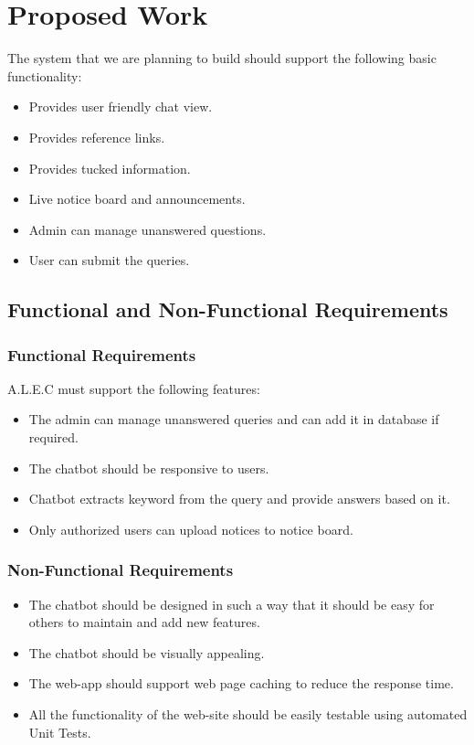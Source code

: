 \documentclass{mnnit}
\begin{document}
\chapter{Proposed Work}
The system that we are planning to build should support the following basic functionality:

\begin{itemize}
	\item Provides user friendly chat view.
	\item Provides reference links.
	\item Provides tucked information.
	\item Live notice board and announcements.
    \item Admin can manage unanswered questions.
	\item User can submit the queries.
\end{itemize}


\section{Functional and Non-Functional Requirements}
\subsection{Functional Requirements}
   A.L.E.C must support the following features:

\begin{itemize}
	\item The admin can manage unanswered queries and can add it in database if required.
	\item The chatbot should be responsive to users.
	\item Chatbot extracts keyword from the query and provide answers based on it.
	\item Only authorized users can upload notices to notice board.
\end{itemize}
\subsection{Non-Functional Requirements}
\begin{itemize}
	\item The chatbot should be designed in such a way that it should be easy for others to maintain and add new features.
	\item The chatbot should be visually appealing.
	\item The web-app should support web page caching to reduce the response time.
	\item All the functionality of the web-site should be easily testable using automated Unit Tests.
\end{itemize}
\end{document}
